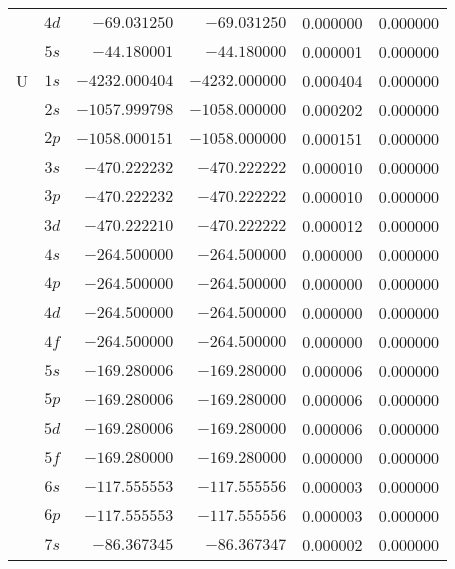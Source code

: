 \begin{table}[h!]
\begin{center}
\begin{tabular}{ c | c | r | r | r | r }
    &  $4d$  &  $-69.031250$  &  $-69.031250$  &  0.000000  &  0.000000 \\
    &  $5s$  &  $-44.180001$  &  $-44.180000$  &  0.000001  &  0.000000 \\ \hline
  U &  $1s$  &  $-4232.000404$  &  $-4232.000000$  &  0.000404  &  0.000000 \\ 
    &  $2s$  &  $-1057.999798$  &  $-1058.000000$  &  0.000202  &  0.000000 \\ 
    &  $2p$  &  $-1058.000151$  &  $-1058.000000$  &  0.000151  &  0.000000 \\ 
    &  $3s$  &  $-470.222232$  &  $-470.222222$  &  0.000010  &  0.000000 \\ 
    &  $3p$  &  $-470.222232$  &  $-470.222222$  &  0.000010  &  0.000000 \\ 
    &  $3d$  &  $-470.222210$  &  $-470.222222$  &  0.000012  &  0.000000 \\ 
    &  $4s$  &  $-264.500000$  &  $-264.500000$  &  0.000000  &  0.000000 \\ 
    &  $4p$  &  $-264.500000$  &  $-264.500000$  &  0.000000  &  0.000000 \\ 
    &  $4d$  &  $-264.500000$  &  $-264.500000$  &  0.000000  &  0.000000 \\
    &  $4f$  &  $-264.500000$  &  $-264.500000$  &  0.000000  &  0.000000 \\ 
    &  $5s$  &  $-169.280006$  &  $-169.280000$  &  0.000006  &  0.000000 \\ 
    &  $5p$  &  $-169.280006$  &  $-169.280000$  &  0.000006  &  0.000000 \\ 
    &  $5d$  &  $-169.280006$  &  $-169.280000$  &  0.000006  &  0.000000 \\
    &  $5f$  &  $-169.280000$  &  $-169.280000$  &  0.000000  &  0.000000 \\ 
    &  $6s$  &  $-117.555553$  &  $-117.555556$  &  0.000003  &  0.000000 \\ 
    &  $6p$  &  $-117.555553$  &  $-117.555556$  &  0.000003  &  0.000000 \\ 
    &  $7s$  &  $-86.367345$  &  $-86.367347$  &  0.000002  &  0.000000 \\ 
  \hline  
\end{tabular}
\end{center}
\end{table}
